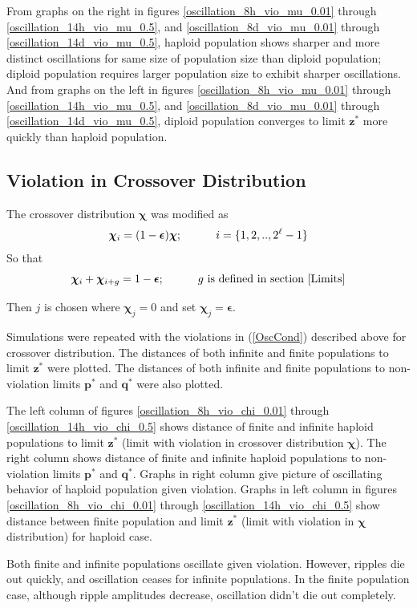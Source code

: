 From graphs on the right in 
figures \ref{oscillation_8h_vio_mu_0.01} through \ref{oscillation_14h_vio_mu_0.5}, 
and \ref{oscillation_8d_vio_mu_0.01} through \ref{oscillation_14d_vio_mu_0.5}, haploid population shows sharper and 
more distinct oscillations for same size of population size than diploid population; diploid population 
requires larger population size to exhibit sharper oscillations. 
And from graphs on the left in figures \ref{oscillation_8h_vio_mu_0.01} through \ref{oscillation_14h_vio_mu_0.5}, and \ref{oscillation_8d_vio_mu_0.01} through \ref{oscillation_14d_vio_mu_0.5}, diploid population converges to limit $\bm{z}^\ast$ more quickly than haploid population. 

\subsection{Violation in Crossover Distribution}
The crossover distribution $\bm{\chi}$ was modified as
\[
\bm{\chi}_i = (1-\bm{\epsilon}) \bm{\chi} ; \hspace{30pt} i = \{1, 2,.., 2^{\ell}-1\} 
\]
So that 
\[
\bm{\chi}_i + \bm{\chi}_{i+g} = 1-\bm{\epsilon} ; \hspace{30pt} g \text{ is defined in  section } \ref{Limits}
\]

Then $j$ is chosen where $\bm{\chi}_j = 0$ and set $\bm{\chi}_j = \bm{\epsilon}$. 

Simulations were repeated with the violations in (\ref{OscCond}) described above for crossover distribution.
The distances of both infinite and finite populations to limit $\bm{z}^\ast$ were plotted. 
The distances of both infinite and finite populations to non-violation limits $\bm{p}^\ast$ and $\bm{q}^\ast$ were also plotted.


The left column of figures \ref{oscillation_8h_vio_chi_0.01} through \ref{oscillation_14h_vio_chi_0.5} 
shows distance of finite and infinite haploid populations to limit $\bm{z^\ast}$ (limit with violation in crossover distribution $\bm{\chi}$). The 
right column shows distance of finite and infinite haploid populations to non-violation limits $\bm{p^\ast}$ and $\bm{q^\ast}$. 
Graphs in right column give picture of oscillating behavior of haploid population given violation. 
Graphs in left column in figures \ref{oscillation_8h_vio_chi_0.01} through \ref{oscillation_14h_vio_chi_0.5} show distance 
between finite population and limit $\bm{z}^\ast$ (limit with violation in $\bm{\chi}$ distribution) for haploid case.

Both finite and infinite populations oscillate given violation. However, ripples die out quickly, 
and oscillation ceases for infinite populations.
In the finite population case, although ripple amplitudes decrease, oscillation didn't die out completely. 

